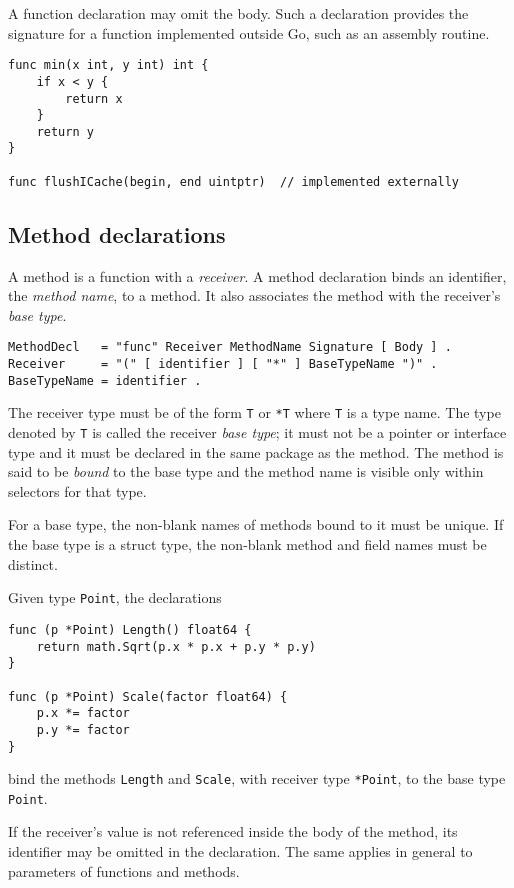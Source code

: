 A function declaration may omit the body. Such a declaration provides
the signature for a function implemented outside Go, such as an assembly
routine.

\begin{Verbatim}[frame=single]
func min(x int, y int) int {
    if x < y {
        return x
    }
    return y
}

func flushICache(begin, end uintptr)  // implemented externally
\end{Verbatim}

\subsection*{Method declarations}

A method is a function with a \emph{receiver}. A method declaration
binds an identifier, the \emph{method name}, to a method. It also
associates the method with the receiver's \emph{base type}.

\begin{Verbatim}[frame=single]
MethodDecl   = "func" Receiver MethodName Signature [ Body ] .
Receiver     = "(" [ identifier ] [ "*" ] BaseTypeName ")" .
BaseTypeName = identifier .
\end{Verbatim}

The receiver type must be of the form \texttt{T} or \texttt{*T} where
\texttt{T} is a type name. The type denoted by \texttt{T} is called the
receiver \emph{base type}; it must not be a pointer or interface type
and it must be declared in the same package as the method. The method is
said to be \emph{bound} to the base type and the method name is visible
only within selectors for that type.

For a base type, the non-blank names of
methods bound to it must be
unique. If the base type is a
struct type, the non-blank method and field
names must be distinct.

Given type \texttt{Point}, the declarations

\begin{Verbatim}[frame=single]
func (p *Point) Length() float64 {
    return math.Sqrt(p.x * p.x + p.y * p.y)
}

func (p *Point) Scale(factor float64) {
    p.x *= factor
    p.y *= factor
}
\end{Verbatim}

bind the methods \texttt{Length} and \texttt{Scale}, with receiver type
\texttt{*Point}, to the base type \texttt{Point}.

If the receiver's value is not referenced inside the body of the method,
its identifier may be omitted in the declaration. The same applies in
general to parameters of functions and methods.

